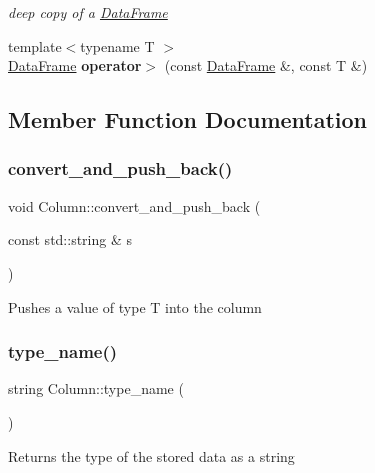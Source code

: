 \begin{DoxyCompactItemize}
\begin{DoxyCompactList}\small\item\em deep copy of a \hyperlink{classDataFrame}{Data\+Frame} \end{DoxyCompactList}\item 
\mbox{\label{classColumn_acd17a18489660c217522c8b39ed04867}} 
{\footnotesize template$<$typename T $>$ }\\\hyperlink{classDataFrame}{Data\+Frame} {\bfseries operator$>$} (const \hyperlink{classDataFrame}{Data\+Frame} \&, const T \&)
\end{DoxyCompactItemize}


\subsection{Member Function Documentation}
\mbox{\label{classColumn_a9a318e80a0581ab65f1ec81499064bc4}} 
\subsubsection{\texorpdfstring{convert\+\_\+and\+\_\+push\+\_\+back()}{convert\_and\_push\_back()}}
{\footnotesize\ttfamily void Column\+::convert\+\_\+and\+\_\+push\+\_\+back (\begin{DoxyParamCaption}\item[{const std\+::string \&}]{s }\end{DoxyParamCaption})}

Pushes a value of type T into the column \mbox{\label{classColumn_a4e1088bc99d0408a533a2eadfbcdca23}} 
\subsubsection{\texorpdfstring{type\+\_\+name()}{type\_name()}}
{\footnotesize\ttfamily string Column\+::type\+\_\+name (\begin{DoxyParamCaption}{ }\end{DoxyParamCaption})}

Returns the type of the stored data as a string 

